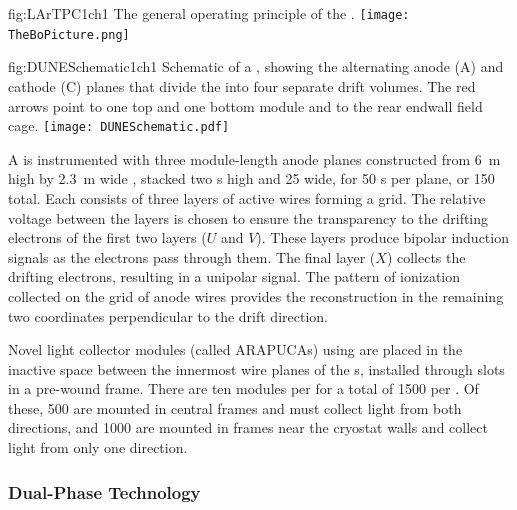 \begin{dunefigure}{fig:LArTPC1ch1}
{The general operating principle of the  .}
\texttt{[image: TheBoPicture.png]} 
\end{dunefigure}

\begin{dunefigure}{fig:DUNESchematic1ch1}
{Schematic of a \nominalmodsize {}  , showing the alternating anode (A) and cathode (C) planes that divide the  into four separate drift volumes. The red arrows point to one top and one bottom  module and to the rear endwall field cage.}
\texttt{[image: DUNESchematic.pdf]}
\end{dunefigure}

A  is instrumented with three module-length anode planes constructed from \SI{6}{m} high by \SI{2.3}{m} wide , stacked two s high and 25 wide, for 50 s per plane, or 150 total. Each  consists of three layers of active wires forming a grid. The relative voltage between the layers is chosen to ensure the transparency to the drifting electrons of the first two layers ($U$ and $V$). These layers produce bipolar induction signals as the electrons pass through them. The final layer ($X$) collects the drifting electrons, resulting in a unipolar signal. The pattern of ionization collected on the grid of anode wires provides the reconstruction in the remaining two coordinates perpendicular to the drift direction.



Novel  light collector modules (called ARAPUCAs) using  are placed in the inactive space between the innermost wire planes of the s, installed through slots in a pre-wound  frame. 
There are ten  modules per  for a total of \num{1500} per .  Of these, \num{500} are mounted in central  frames and must collect light from both directions, 
and \num{1000} are mounted in frames  near the %
cryostat walls and collect light from only one direction. 

\FloatBarrier
\subsubsection{Dual-Phase Technology}
\label{sec:fddp-exec-splar}

